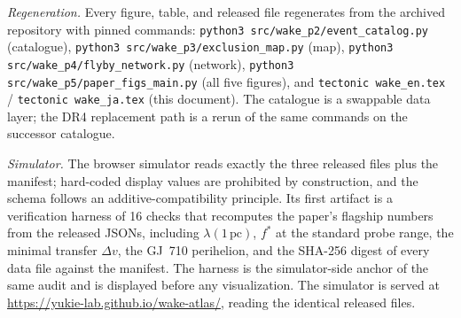 \documentclass[11pt]{article}
\newcommand{\pc}{\,\mathrm{pc}}
\newcommand{\lam}{\lambda}
\begin{document}
\emph{Regeneration.} Every figure, table, and released file regenerates
from the archived repository with pinned commands:
\texttt{python3 src/wake\_p2/event\_catalog.py} (catalogue),
\texttt{python3 src/wake\_p3/exclusion\_map.py} (map),
\texttt{python3 src/wake\_p4/flyby\_network.py} (network),
\texttt{python3 src/wake\_p5/paper\_figs\_main.py} (all five figures), and
\texttt{tectonic wake\_en.tex} / \texttt{tectonic wake\_ja.tex} (this
document). The catalogue is a swappable data layer; the DR4 replacement
path is a rerun of the same commands on the successor catalogue.

\emph{Simulator.} The browser simulator reads exactly the three released
files plus the manifest; hard-coded display values are prohibited by
construction, and the schema follows an additive-compatibility principle.
Its first artifact is a verification harness of 16 checks that recomputes
the paper's flagship numbers from the released JSONs, including
$\lam(1\pc)$, $f^*$ at the standard probe range, the minimal transfer
$\Delta v$, the GJ~710 perihelion, and the SHA-256 digest of every data
file against the manifest. The harness is the simulator-side anchor of the
same audit and is displayed before any visualization. The simulator is
served at \url{https://yukie-lab.github.io/wake-atlas/}, reading the
identical released files.



\end{document}
